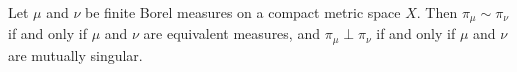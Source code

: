 Let $\mu$ and $\nu$ be finite Borel measures on a compact metric space $X$. Then $\pi_\mu \sim \pi_\nu$ if and only if $\mu$ and $\nu$ are equivalent measures, and $\pi_\mu \perp \pi_\nu$ if and only if $\mu$ and $\nu$ are mutually singular.
